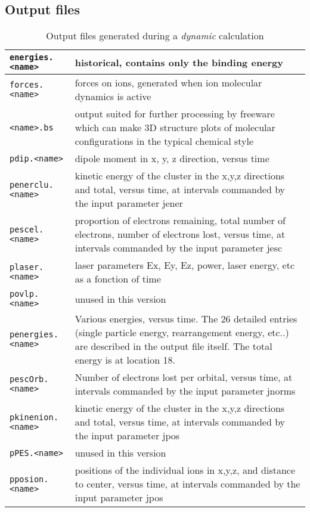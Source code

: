\documentclass[11pt,a4paper]{article}
\begin{document}
		\subsection{Output files}
			\begin{table}[t]
				\caption{Output files generated during a \emph{dynamic} calculation}\label{tab:dynamic-output-files}
				\begin{tabular}{|p{4.5cm}|p{10.2cm}|}
					\hline
					\texttt{energies.<name>} & historical, contains only the binding energy\\
					\hline
					\texttt{forces.<name>} & forces on ions, generated when ion molecular dynamics is active\\
					\hline
					\texttt{<name>.bs} & output suited for further processing by freeware which  can make 3D structure plots of molecular configurations in the typical chemical style\\
					\hline
					\texttt{pdip.<name>} &  dipole moment in x, y, z direction, versus time \\
					\hline
					\texttt{penerclu.<name>} & kinetic energy of the cluster in the x,y,z directions and total, versus time, at intervals commanded by the input parameter jener\\
					\hline
					\texttt{pescel.<name>} & proportion of electrons remaining, total number of electrons, number of electrons lost, versus time, at intervals commanded by the input parameter jesc\\
					\hline
					\texttt{plaser.<name>} & laser parameters Ex, Ey, Ez, power, laser energy, etc as a fonction of time\\
					\hline
					\texttt{povlp.<name>} & unused in this version\\
					\hline
					\texttt{penergies.<name>} & Various energies, versus time. The 26 detailed entries (single particle energy, rearrangement energy, etc..) are described in the output file itself. The total energy is at location 18. \\
					\hline
					\texttt{pescOrb.<name>} & Number of electrons lost per orbital, versus time, at intervals commanded by the input parameter jnorms \\
					\hline
					\texttt{pkinenion.<name>} & kinetic energy of the cluster in the x,y,z directions and total, versus time, at intervals commanded by the input parameter jpos\\
					\hline
					\texttt{pPES.<name>} & unused in this version\\
					\hline
					\texttt{pposion.<name>} & positions of the individual ions in x,y,z, and distance to center, versus time, at intervals commanded by the input parameter jpos\\

\end{tabular}
\end{table}
\end{document}
